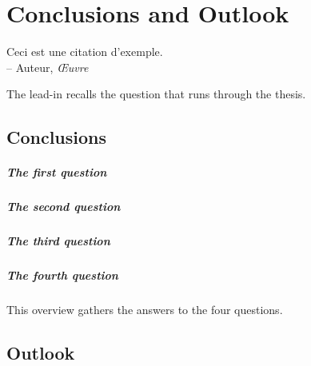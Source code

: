 \documentclass[../main]{subfiles}
\begin{document}
\ifSubfilesClassLoaded{\setcounter{chapter}{2}}{}

\chapter{Conclusions and Outlook}
\label{ch:ch3}
\begin{otherlanguage}{french}
\begin{chquote}
Ceci est une citation d'exemple. \\
\bigskip
-- Auteur, \textit{Œuvre}
\end{chquote}
\end{otherlanguage}

\vfill

\clearpage

The lead-in recalls the question that runs through the thesis.
\lipsum[1][1-6]

\section{Conclusions}
\label{sec:conclusions}

\paragraph{The first question}
\lipsum[2][1-6]

\paragraph{The second question}
\lipsum[3][1-6]

\paragraph{The third question}
\lipsum[4][1-6]

\paragraph{The fourth question}
\lipsum[5][1-6]

\sectionclose
This overview gathers the answers to the four questions.
\lipsum[6][1-3]

\section{Outlook}
\label{sec:outlook}
\lipsum[7][1-5]
\end{document}
